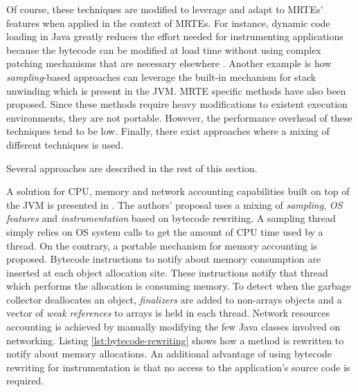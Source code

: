 Of course, these techniques are modified to leverage and adapt to MRTEs' features when applied in the context of MRTEs.
For instance, dynamic code loading in Java greatly reduces the effort needed for instrumenting applications because the bytecode can be modified at load time without using complex patching mechanisms that are necessary elsewhere \cite{Gregg:2011:DDT:1971960}.
Another example is how \textit{sampling}-based approaches can leverage the built-in mechanism for stack unwinding which is present in the JVM.
MRTE specific methods have also been proposed.
Since these methods require heavy modifications to existent execution environments, they are not portable.
However, the performance overhead of these techniques tend to be low.
Finally, there exist approaches where a mixing of different techniques is used.

Several approaches are described in the rest of this section.

A solution for CPU, memory and network accounting capabilities built on top of the JVM is presented in \cite{czajkowski_jres:_1998}.
The authors' proposal uses a mixing of \textit{sampling}, \textit{OS features} and \textit{instrumentation} based on bytecode rewriting.
A sampling thread simply relies on OS system calls to get the amount of CPU time used by a thread.
On the contrary, a portable mechanism for memory accounting is proposed.
Bytecode instructions to notify about memory consumption are inserted at each object allocation site.
These instructions notify that thread which performs the allocation is consuming memory.
To detect when the garbage collector deallocates an object, \textit{finalizers} are added to non-arrays objects and a vector of \textit{weak references} to arrays is held in each thread.
Network resources accounting is achieved by manually modifying the few Java classes involved on networking.
Listing \ref{lst:bytecode-rewriting} shows how a method is rewritten to notify about memory allocations.
An additional advantage of using bytecode rewriting for instrumentation is that no access to the application's source code is required.

\begin{lstlisting}
\end{lstlisting}



